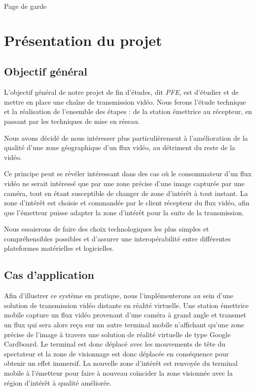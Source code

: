 \documentclass[11pt,a4paper]{article}
\begin{document}
Page de garde

\newpage

\section{Présentation du projet}

\subsection{Objectif général}
L'objectif général de notre projet de fin d'études, dit \textit{PFE}, est d'étudier et de mettre en place une chaîne de transmission vidéo.
Nous ferons l'étude technique et la réalisation de l'ensemble des étapes : de la station émettrice au récepteur, en passant par les techniques de mise en réseau.

\bigbreak
Nous avons décidé de nous intéresser plus particulièrement à l'amélioration de la qualité d'une zone géographique d'un flux vidéo, au détriment du reste de la vidéo.

Ce principe peut se révéler intéressant dans des cas où le consommateur d'un flux vidéo ne serait intéressé que par une zone précise d'une image capturée par une caméra, tout en étant susceptible de changer de zone d'intérêt à tout instant.
La zone d'intérêt est choisie et commandée par le client récepteur du flux vidéo, afin que l'émetteur puisse adapter la zone d’intérêt pour la suite de la transmission.

\bigbreak
Nous essaierons de faire des choix technologiques les plus simples et compréhensibles possibles et d'assurer une interopérabilité entre différentes plateformes matérielles et logicielles.

\subsection{Cas d'application}

Afin d'illustrer ce système en pratique, nous l'implémenterons au sein d'une solution de transmission vidéo distante en réalité virtuelle.
Une station émettrice mobile capture un flux vidéo provenant d'une caméra à grand angle et transmet un flux qui sera alors reçu sur un autre terminal mobile n'affichant qu'une zone précise de l'image à travers une solution de réalité virtuelle de type Google Cardboard.
Le terminal est donc déplacé avec les mouvements de tête du spectateur et la zone de visionnage est donc déplacée en conséquence pour obtenir un effet immersif.
La nouvelle zone d’intérêt est renvoyée du terminal mobile à l'émetteur pour faire à nouveau coïncider la zone visionnée avec la région d'intérêt à qualité améliorée.
\end{document}
